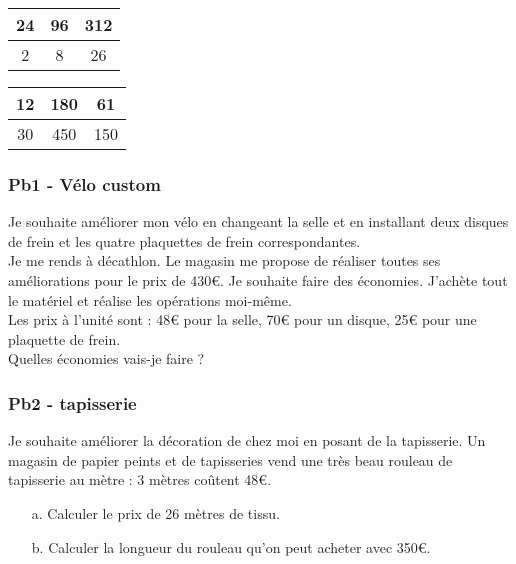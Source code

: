 \begin{multicols}{2}\noindent
  \begin{center}\begin{tabular}{|c|c|c|} \hline
    24 & 96 & 312 \\  \hline
    2 & 8 & 26\\  \hline
  \end{tabular}\end{center}
\columnbreak 
  \begin{center}\begin{tabular}{|c|c|c|} \hline
    12 & 180 & 61 \\  \hline
    30 & 450 & 150\\  \hline
  \end{tabular}\end{center}

\end{multicols}

\subsubsection*{Pb1 - Vélo custom}

Je souhaite améliorer mon vélo en changeant la selle et en installant deux disques de frein et les quatre plaquettes de frein correspondantes. \\

Je me rends à décathlon. Le magasin me propose de réaliser toutes ses améliorations pour le prix de 430€. Je souhaite faire des économies. J'achète tout le matériel et réalise les opérations moi-même. \\

Les prix à l'unité sont : 48€ pour la selle, 70€ pour un disque, 25€ pour une plaquette de frein.\\

Quelles économies vais-je faire ?

\subsubsection*{Pb2 - tapisserie}

Je souhaite améliorer la décoration de chez moi en posant de la tapisserie. Un magasin de papier peints et de tapisseries vend une très beau rouleau de tapisserie au mètre : 3 mètres coûtent 48€.

\begin{enumerate}
  \item[a.] Calculer le prix de 26 mètres de tissu.
  \item[b.] Calculer la longueur du rouleau qu'on peut acheter avec 350€.
\end{enumerate}  


